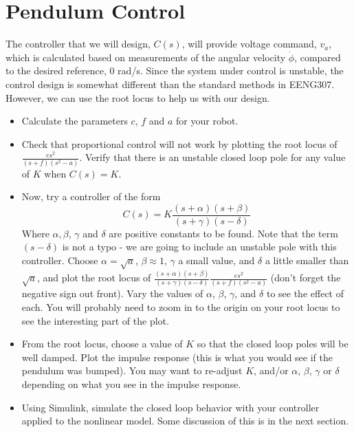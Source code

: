 \section{Pendulum Control}

The controller that we will design, $C(s)$, will provide voltage command, $v_{a}$, which is calculated based on measurements of the angular velocity $\dot{\phi}$, compared to the desired reference, $0$ rad/s. Since the system under control is unstable, the control design is somewhat different than the standard methods in EENG307. However, we can use the root locus to help us with our design. 


\begin{itemize}
\item Calculate the parameters $c$, $f$ and $a$ for your robot.
\item Check that proportional control will not work by plotting the root locus of $\frac{es^2}{(s+f)(s^{2}-a)}$. Verify that there is an unstable closed loop pole for any value of $K$ when $C(s)=K$.
\item Now, try a controller of the form
\[
C(s) = K\frac{(s+\alpha)(s+\beta)}{(s+\gamma)(s-\delta)}
\]
Where $\alpha, \beta$, $\gamma$ and $\delta$ are positive constants to be found. Note that the term $(s-\delta)$ is not a typo - we are going to include an unstable pole with this controller. 
Choose $\alpha=\sqrt{a}$, $\beta \approx 1$, $\gamma$ a small value, and $\delta$ a little smaller than $\sqrt{a}$, and plot the root locus of $\frac{(s+\alpha)(s+\beta)}{(s+\gamma)(s-\delta)}\frac{es^2}{(s+f)(s^{2}-a)}$ (don't forget the negative sign out front). Vary the values of $\alpha$, $\beta$, $\gamma$, and $\delta$ to see the effect of each. You will probably need to zoom in to the origin on your root locus to see the interesting part of the plot. %
\item From the root locus, choose a value of $K$ so that the closed loop poles will be well damped. Plot the impulse response (this is what you would see if the pendulum was bumped). You may want to re-adjust $K$, and/or $\alpha$, $\beta$, $\gamma$ or $\delta$ depending on what you see in the impulse response.
\item Using Simulink, simulate the closed loop behavior with your controller applied to the nonlinear model. Some discussion of this is in the next section. 
\end{itemize}

